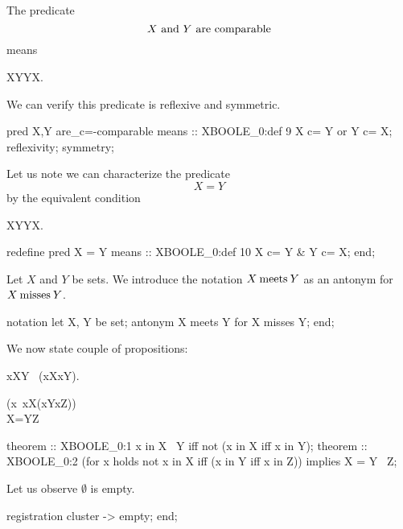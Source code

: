 \begin{paracol}{2}
\switchcolumn*\ensurevspace{5cm}
\noindent The predicate
\[X\mbox{ and }Y\mbox{ are comparable}\]
means
\begin{definition}
X\subset Y\lor Y\subset X.
\end{definition}
We can verify this predicate is reflexive and symmetric.
\switchcolumn
\begin{mizar}
  pred X,Y are_c=-comparable
  means :: XBOOLE_0:def 9
  X c= Y or Y c= X;
  reflexivity;
  symmetry;
\end{mizar}

\switchcolumn*\ensurevspace{5cm}
\noindent Let us note we can characterize the predicate
\[ X = Y \]
by the equivalent condition
\begin{definition}
X\subset Y\land Y\subset X.
\end{definition}
\switchcolumn
\begin{mizar}
  redefine pred X = Y
  means :: XBOOLE_0:def 10
  X c= Y & Y c= X;
end;
\end{mizar}

\switchcolumn*\ensurevspace{5cm}
Let $X$ and $Y$ be sets. We introduce the notation $X\mathbin{\text{meets}} Y$ as an
antonym for $X\mathbin{\text{misses}} Y$.
\switchcolumn
\begin{mizar}
notation
  let X, Y be set;
  antonym X meets Y for X misses Y;
end;
\end{mizar}

\switchcolumn*\ensurevspace{5cm}
We now state couple of propositions:
\begin{theorem}
x\in X\dotminus Y \iff\ \neg(x\in X\iff x\in Y).
\end{theorem}
\begin{theorem+}
(\forall x\holds\ \neg x\in X\iff (x\in Y\iff x\in Z))\\
\implies X=Y\dotminus Z
\end{theorem+}
\switchcolumn
\begin{mizar}
theorem :: XBOOLE_0:1
 x in X \+\ Y
 iff not (x in X iff x in Y);
theorem :: XBOOLE_0:2
 (for x holds not x in X
              iff (x in Y iff x in Z))
  implies X = Y \+\ Z;
\end{mizar}

\switchcolumn*\ensurevspace{5cm}
Let us observe $\emptyset$ is empty.
\switchcolumn
\begin{mizar}
registration
  cluster {} -> empty;
end;
\end{mizar}


\end{paracol}
